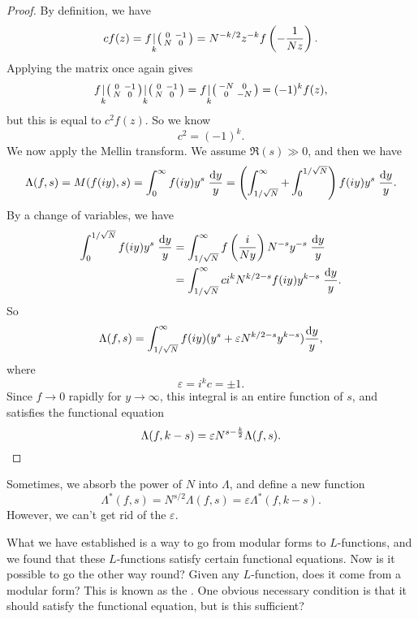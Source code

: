 \documentclass[a4paper]{article}
\begin{document}
\begin{proof}
  By definition, we have
  \[
    c f(z) =
    f\underset{k}{|}
    \begin{psmallmatrix}
      0 & -1\\
      N & 0
    \end{psmallmatrix} = N^{-k/2} z^{-k} f\left(-\frac{1}{Nz}\right).
  \]
  Applying the matrix once again gives
  \[
    f\underset{k}{|}
    \begin{psmallmatrix}
      0 & -1\\
      N & 0
    \end{psmallmatrix}\underset{k}{|}
    \begin{psmallmatrix}
      0 & -1\\
      N & 0
    \end{psmallmatrix}
    =
    f\underset{k}{|}
    \begin{psmallmatrix}
      -N & 0\\
      0 & -N
    \end{psmallmatrix}
    = (-1)^k f(z),
  \]
  but this is equal to $c^2 f(z)$. So we know
  \[
    c^2 = (-1)^k.
  \]
  We now apply the Mellin transform. We assume $\Re(s) \gg 0$, and then we have
  \[
    \Lambda(f, s) = M(f(iy), s) = \int_0^\infty f(iy) y^s\;\frac{\mathrm{d} y}{y} = \left(\int_{1/\sqrt{N}}^{\infty} + \int_0^{1/\sqrt{N}}\right) f(iy) y^s\;\frac{\mathrm{d} y}{y}.
  \]
  By a change of variables, we have
  \begin{align*}
    \int_0^{1/\sqrt{N}} f(iy) y^s\; \frac{\mathrm{d} y}{y} &= \int_{1/\sqrt{N}}^\infty f\left(\frac{i}{Ny}\right) N^{-s}y^{-s} \;\frac{\mathrm{d} y}{y} \\
    &= \int_{1/\sqrt{N}}^\infty c i^k N^{k/2 - s} f(iy) y^{k - s} \;\frac{\mathrm{d} y}{y}.
  \end{align*}
  So
  \[
    \Lambda(f, s) = \int_{1/\sqrt{N}}^\infty f(iy) (y^s + \varepsilon N^{k/2 - s} y^{k - s}) \frac{\mathrm{d} y}{y},
  \]
  where
  \[
    \varepsilon = i^k c = \pm 1.
  \]
  Since $f\to 0$ rapidly for $y \to \infty$, this integral is an entire function of $s$, and satisfies the functional equation
  \[
    \Lambda(f, k - s) = \varepsilon N^{s - \frac{k}{2}} \Lambda (f, s).\qedhere
  \]
\end{proof}
Sometimes, we absorb the power of $N$ into $\Lambda$, and define a new function
\[
  \Lambda^*(f, s) = N^{s/2} \Lambda(f, s) = \varepsilon \Lambda^*(f, k - s).
\]
However, we can't get rid of the $\varepsilon$.

What we have established is a way to go from modular forms to $L$-functions, and we found that these $L$-functions satisfy certain functional equations. Now is it possible to go the other way round? Given any $L$-function, does it come from a modular form? This is known as the . One obvious necessary condition is that it should satisfy the functional equation, but is this sufficient?
\end{document}
